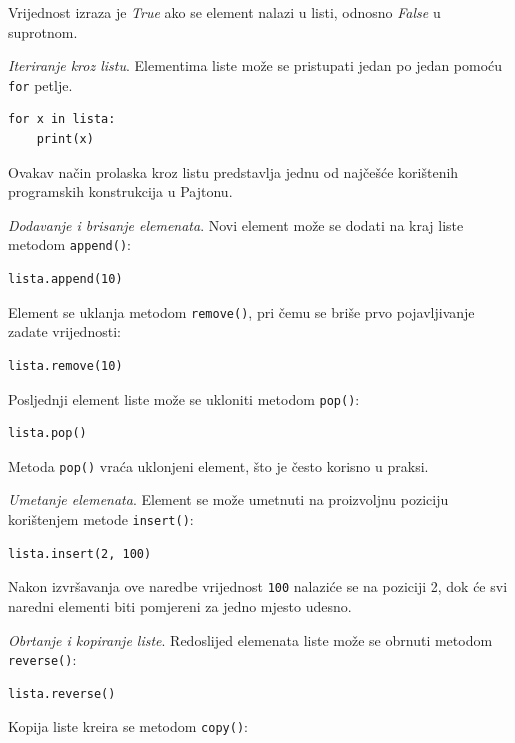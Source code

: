 Vrijednost izraza je \emph{True} ako se element nalazi u listi, odnosno \emph{False} u suprotnom.

\textit{Iteriranje kroz listu}. Elementima liste može se pristupati jedan po jedan pomoću \texttt{for} petlje.

\begin{verbatim}
for x in lista:
    print(x)
\end{verbatim}

Ovakav način prolaska kroz listu predstavlja jednu od najčešće korištenih programskih konstrukcija u Pajtonu.

\textit{Dodavanje i brisanje elemenata}. Novi element može se dodati na kraj liste metodom \texttt{append()}:

\begin{verbatim}
lista.append(10)
\end{verbatim}

Element se uklanja metodom \texttt{remove()}, pri čemu se briše prvo pojavljivanje zadate vrijednosti:

\begin{verbatim}
lista.remove(10)
\end{verbatim}

Posljednji element liste može se ukloniti metodom \texttt{pop()}:

\begin{verbatim}
lista.pop()
\end{verbatim}

Metoda \texttt{pop()} vraća uklonjeni element, što je često korisno u praksi.

\textit{Umetanje elemenata}.  Element se može umetnuti na proizvoljnu poziciju korištenjem metode \texttt{insert()}:

\begin{verbatim}
lista.insert(2, 100)
\end{verbatim}

Nakon izvršavanja ove naredbe vrijednost \texttt{100} nalaziće se na poziciji 2, dok će svi naredni elementi biti pomjereni za jedno mjesto udesno.

\textit{Obrtanje i kopiranje liste}. Redoslijed elemenata liste može se obrnuti metodom \texttt{reverse()}:

\begin{verbatim}
lista.reverse()
\end{verbatim}

Kopija liste kreira se metodom \texttt{copy()}:

